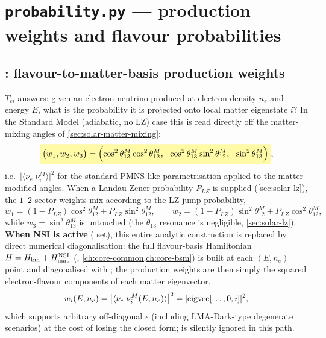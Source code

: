\section{\texttt{probability.py} --- production weights and flavour probabilities}
\label{sec:solar-probability}


\begin{theorybox}
\subsection*{: flavour-to-matter-basis production weights}
$T_{ei}$ answers: given an electron neutrino produced at electron density
$n_e$ and energy $E$, what is the probability it is projected onto local
matter eigenstate $i$? In the Standard Model (adiabatic, no LZ) case this
is read directly off the matter-mixing angles of
\cref{sec:solar-matter-mixing}:
\begin{equation}
  \keyresult{
  \bigl(w_1,w_2,w_3\bigr) =
  \Bigl(\cos^2\theta_{13}^M\cos^2\theta_{12}^M,\ \
        \cos^2\theta_{13}^M\sin^2\theta_{12}^M,\ \
        \sin^2\theta_{13}^M\Bigr)
  },
\end{equation}
i.e.\ $|\langle\nu_e|\nu_i^M\rangle|^2$ for the standard PMNS-like
parametrisation applied to the matter-modified angles. When a
Landau-Zener probability $P_{LZ}$ is supplied (\cref{sec:solar-lz}), the
$1$--$2$ sector weights mix according to the LZ jump probability,
\begin{equation}
  w_1 = (1-P_{LZ})\cos^2\theta_{12}^M + P_{LZ}\sin^2\theta_{12}^M,
  \qquad
  w_2 = (1-P_{LZ})\sin^2\theta_{12}^M + P_{LZ}\cos^2\theta_{12}^M,
\end{equation}
while $w_3=\sin^2\theta_{13}^M$ is untouched (the $\theta_{13}$ resonance
is negligible, \cref{sec:solar-lz}). \textbf{When NSI is active}
(\code{oscillation.nsi} set), this entire analytic construction is
replaced by direct numerical diagonalisation: the full flavour-basis
Hamiltonian $H=H_{\rm kin}+H_{\rm mat}^{\rm NSI}$
(\pyfunc{hamiltonian\_flavour}, \cref{ch:core-common,ch:core-bsm}) is built
at each $(E,n_e)$ point and diagonalised with ;
the production weights are then simply the squared electron-flavour
components of each matter eigenvector,
\begin{equation}
  w_i(E,n_e) = \bigl|\langle\nu_e|\nu_i^M(E,n_e)\rangle\bigr|^2 = |{\rm eigvec}[\dots,0,i]|^2,
\end{equation}
which supports arbitrary off-diagonal $\epsilon$ (including LMA-Dark-type
degenerate scenarios) at the cost of losing the closed form; 
is silently ignored in this path.


\end{theorybox}
